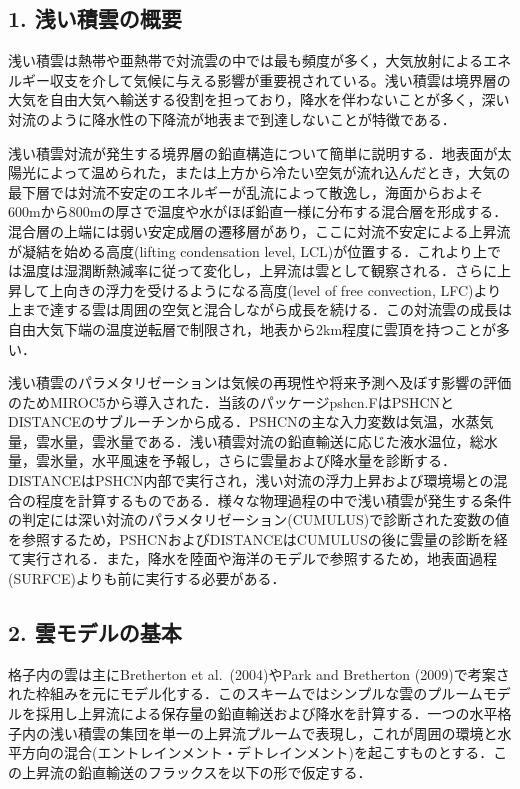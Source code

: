 \hypertarget{ux6d45ux3044ux7a4dux96f2ux306eux6982ux8981}{%
\subsection{1.
浅い積雲の概要}\label{ux6d45ux3044ux7a4dux96f2ux306eux6982ux8981}}

浅い積雲は熱帯や亜熱帯で対流雲の中では最も頻度が多く，大気放射によるエネルギー収支を介して気候に与える影響が重要視されている。浅い積雲は境界層の大気を自由大気へ輸送する役割を担っており，降水を伴わないことが多く，深い対流のように降水性の下降流が地表まで到達しないことが特徴である．

浅い積雲対流が発生する境界層の鉛直構造について簡単に説明する．地表面が太陽光によって温められた，または上方から冷たい空気が流れ込んだとき，大気の最下層では対流不安定のエネルギーが乱流によって散逸し，海面からおよそ600mから800mの厚さで温度や水がほぼ鉛直一様に分布する混合層を形成する．混合層の上端には弱い安定成層の遷移層があり，ここに対流不安定による上昇流が凝結を始める高度(lifting
condensation level,
LCL)が位置する．これより上では温度は湿潤断熱減率に従って変化し，上昇流は雲として観察される．さらに上昇して上向きの浮力を受けるようになる高度(level
of free convection,
LFC)より上まで達する雲は周囲の空気と混合しながら成長を続ける．この対流雲の成長は自由大気下端の温度逆転層で制限され，地表から2km程度に雲頂を持つことが多い．

浅い積雲のパラメタリゼーションは気候の再現性や将来予測へ及ぼす影響の評価のためMIROC5から導入された．当該のパッケージpshcn.FはPSHCNとDISTANCEのサブルーチンから成る．PSHCNの主な入力変数は気温，水蒸気量，雲水量，雲氷量である．浅い積雲対流の鉛直輸送に応じた液水温位，総水量，雲氷量，水平風速を予報し，さらに雲量および降水量を診断する．DISTANCEはPSHCN内部で実行され，浅い対流の浮力上昇および環境場との混合の程度を計算するものである．様々な物理過程の中で浅い積雲が発生する条件の判定には深い対流のパラメタリゼーション(CUMULUS)で診断された変数の値を参照するため，PSHCNおよびDISTANCEはCUMULUSの後に雲量の診断を経て実行される．また，降水を陸面や海洋のモデルで参照するため，地表面過程(SURFCE)よりも前に実行する必要がある．

\hypertarget{ux96f2ux30e2ux30c7ux30ebux306eux57faux672c}{%
\subsection{2.
雲モデルの基本}\label{ux96f2ux30e2ux30c7ux30ebux306eux57faux672c}}

格子内の雲は主にBretherton et al.~(2004)やPark and Bretherton
(2009)で考案された枠組みを元にモデル化する．このスキームではシンプルな雲のプルームモデルを採用し上昇流による保存量の鉛直輸送および降水を計算する．一つの水平格子内の浅い積雲の集団を単一の上昇流プルームで表現し，これが周囲の環境と水平方向の混合(エントレインメント・デトレインメント)を起こすものとする．この上昇流の鉛直輸送のフラックスを以下の形で仮定する．

